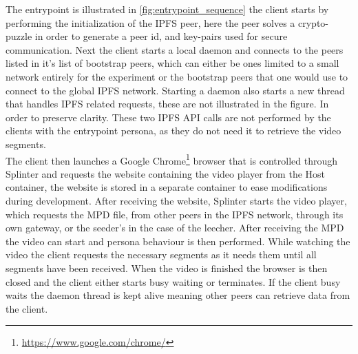 The entrypoint is illustrated in \autoref{fig:entrypoint_sequence} the client starts by performing the initialization of the IPFS peer, here the peer solves a crypto-puzzle in order to generate a peer id, and key-pairs used for secure communication.
Next the client starts a local daemon and connects to the peers listed in it's list of bootstrap peers, which can either be ones limited to a small network entirely for the experiment or the bootstrap peers that one would use to connect to the global \acs{IPFS} network.
Starting a daemon also starts a new thread that handles \acs{IPFS} related requests, these are not illustrated in the figure. In order to preserve clarity. These two \acs{IPFS} \acs{API} calls are not performed by the clients with the entrypoint persona, as they do not need it to retrieve the video segments.\\
The client then launches a Google Chrome\footnote{\url{https://www.google.com/chrome/}} browser that is controlled through Splinter and requests the website containing the video player from the Host container, the website is stored in a separate container to ease modifications during development.
After receiving the website, Splinter starts the video player, which requests the \acs{MPD} file, from other peers in the \acs{IPFS} network, through its own gateway, or the seeder's in the case of the leecher.
After receiving the \acs{MPD} the video can start and persona behaviour is then performed. While watching the video the client requests the necessary segments as it needs them until all segments have been received.
When the video is finished the browser is then closed and the client either starts busy waiting or terminates. If the client busy waits the daemon thread is kept alive meaning other peers can retrieve data from the client.\\



